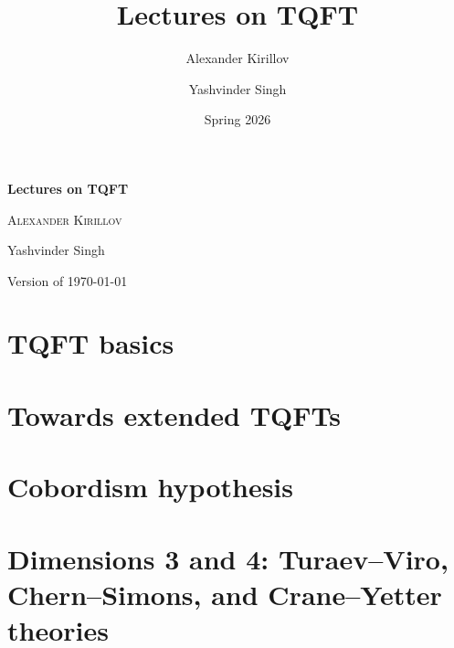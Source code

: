 \documentclass{amsbook}
\numberwithin{equation}{section}
\numberwithin{table}{section}
\numberwithin{figure}{section}
\begin{document}
\frontmatter
\title{Lectures on  TQFT}
\author{Alexander Kirillov}
\author{Yashvinder Singh}
\address{Department of Mathematics, Stony Brook University,
        Stony Brook, NY 11790}
\date{Spring 2026}

\begin{titlepage}
    \centering
    \vspace*{50pt}
    {\Huge\bfseries Lectures on  TQFT \par}
    \vspace{20pt}
    {\Large\scshape Alexander Kirillov \par
    Yashvinder Singh}
    \vfill
    {\large Version of  \today \par} %
    \vfill
\end{titlepage}


\tableofcontents



\mainmatter
\part{TQFT basics}







\part{Towards extended TQFTs}








\part{Cobordism hypothesis}



\part{Dimensions 3 and 4: Turaev--Viro, Chern--Simons, and Crane--Yetter
theories}







\backmatter
\printindex

\end{document}
